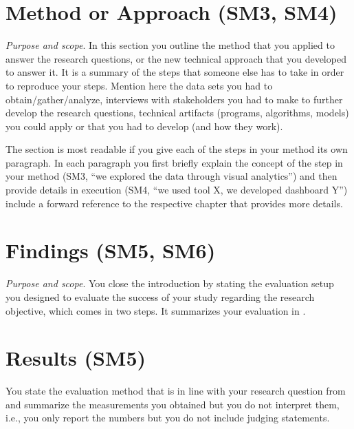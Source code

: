 \section{Method or Approach (SM3, SM4)}\label{sec:introduction:method}

\emph{Purpose and scope}.
In this section you outline the method that you applied to answer the research questions, or the new technical approach that you developed to answer it.
It is a summary of the steps that someone else has to take in order to reproduce your steps.
Mention here the data sets you had to obtain/gather/analyze, interviews with stakeholders you had to make to further develop the research questions, technical artifacts (programs, algorithms, models) you could apply or that you had to develop (and how they work).

The section is most readable if you give each of the steps in your method its own paragraph.
In each paragraph you first briefly explain the concept of the step in your method (SM3, ``we explored the data through visual analytics'') and then provide details in execution (SM4, ``we used tool X, we developed dashboard Y'') include a forward reference to the respective chapter that provides more details.

\section{Findings (SM5, SM6)}\label{sec:introduction:results}

\emph{Purpose and scope}.
You close the introduction by stating the evaluation setup you designed to evaluate the success of your study regarding the research objective, which comes in two steps.
It summarizes your evaluation in .

\section*{Results (SM5)}

You state the evaluation method that is in line with your research question from  and summarize the measurements you obtained but you do not interpret them, i.e., you only report the numbers but you do not include judging statements.

